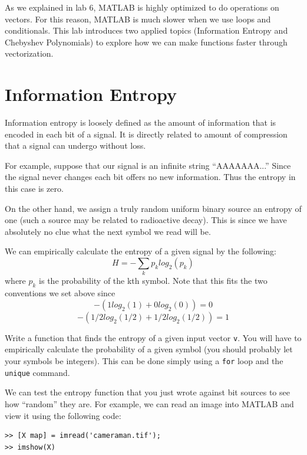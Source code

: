 

As we explained in lab 6, MATLAB is highly optimized to do operations on vectors. For this reason, MATLAB is much slower when we use loops and conditionals. This lab introduces two applied topics (Information Entropy and Chebyshev Polynomials) to explore how we can make functions faster through vectorization.

\section*{Information Entropy}

Information entropy is loosely defined as the amount of information that is encoded in each bit of a signal. It is directly related to amount of compression that a signal can undergo without loss.

For example, suppose that our signal is an infinite string ``AAAAAAA...'' Since the signal never changes each bit offers no new information. Thus the entropy in this case is zero.

On the other hand, we assign a truly random uniform binary source an entropy of one (such a source may be related to radioactive decay). This is since we have absolutely no clue what the next symbol we read will be.

We can empirically calculate the entropy of a given signal by the following:
\[
H = -\sum_k{p_k log_2(p_k)}
\]
where $p_k$ is the probability of the kth symbol. Note that this fits the two conventions we set above since
\[
-(1log_2(1) + 0 log_2(0)) = 0
\]
\[
-(1/2log_2(1/2) + 1/2log_2(1/2)) = 1
\]

\begin{problem}
Write a function that finds the entropy of a given input vector {\tt v}. You will have to empirically calculate the probability of a given symbol (you should probably let your symbols be integers). This can be done simply using a {\tt for} loop and the {\tt unique} command.
\end{problem}

We can test the entropy function that you just wrote against bit sources to see how ``random'' they are. For example, we can read an image into MATLAB and view it using the following code:
\begin{verbatim}
>> [X map] = imread('cameraman.tif');
>> imshow(X)
\end{verbatim}

